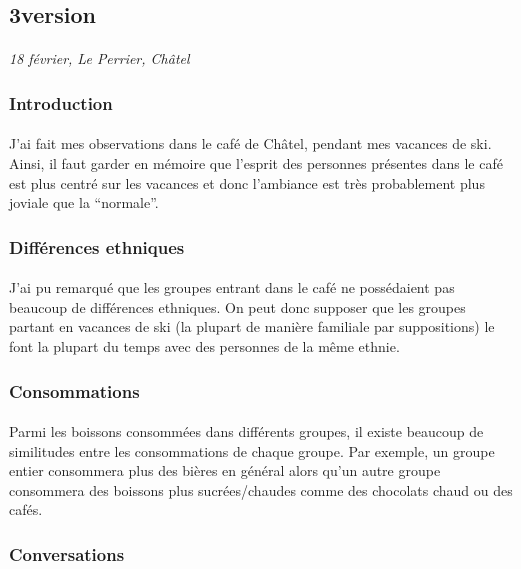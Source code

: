 \subsection{3\ieme version}

\paragraph{}
\emph{18 février, Le Perrier, Châtel}

\subsubsection{Introduction}
\paragraph{}
J'ai fait mes observations dans le café de Châtel, pendant mes vacances de ski.
Ainsi, il faut garder en mémoire que l'esprit des personnes présentes dans le
café est plus centré sur les vacances et donc l'ambiance est très probablement
plus joviale que la ``normale''.

\subsubsection{Différences ethniques}
\paragraph{}
J'ai pu remarqué que les groupes entrant dans le café ne possédaient pas
beaucoup de différences ethniques. On peut donc supposer que les groupes
partant en vacances de ski (la plupart de manière familiale par suppositions)
le font la plupart du temps avec des personnes de la même ethnie.

\subsubsection{Consommations}
\paragraph{}
Parmi les boissons consommées dans différents groupes, il existe beaucoup de
similitudes entre les consommations de chaque groupe. Par exemple, un groupe
entier consommera plus des bières en général alors qu'un autre groupe
consommera des boissons plus sucrées/chaudes comme des chocolats chaud ou des
cafés.

\subsubsection{Conversations}
